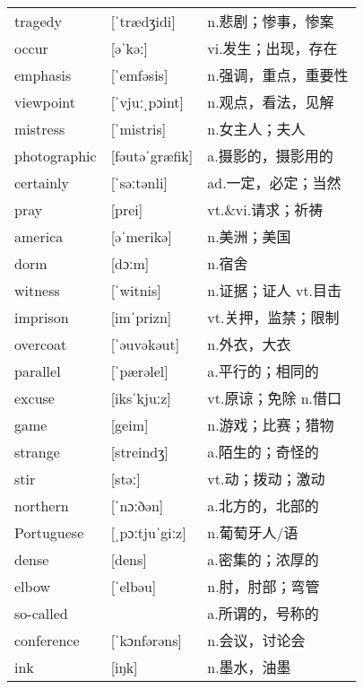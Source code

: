 \documentclass[a4paper]{article}
\begin{document}
\section{}
\begin{tabular}{l l l}

tragedy & [ˈtrædʒidi] & n.悲剧；惨事，惨案 \\
occur & [əˈkəː] & vi.发生；出现，存在 \\
emphasis & [ˈemfəsis] & n.强调，重点，重要性 \\
viewpoint & [ˈvjuːˌpɔint] & n.观点，看法，见解 \\
mistress & [ˈmistris] & n.女主人；夫人 \\
photographic & [fəutəˈgræfik] & a.摄影的，摄影用的 \\
certainly & [ˈsəːtənli] & ad.一定，必定；当然 \\
pray & [prei] & vt.\&vi.请求；祈祷 \\
america & [əˈmerikə] & n.美洲；美国 \\
dorm & [dɔːm] & n.宿舍 \\
witness & [ˈwitnis] & n.证据；证人 vt.目击 \\
imprison & [imˈprizn] & vt.关押，监禁；限制 \\
overcoat & [ˈəuvəkəut] & n.外衣，大衣 \\
parallel & [ˈpærəlel] & a.平行的；相同的 \\
excuse & [iksˈkjuːz] & vt.原谅；免除 n.借口 \\
game & [geim] & n.游戏；比赛；猎物 \\
strange & [streindʒ] & a.陌生的；奇怪的 \\
stir & [stəː] & vt.动；拨动；激动 \\
northern & [ˈnɔːðən] & a.北方的，北部的 \\
Portuguese & [ˌpɔːtjuˈgiːz] & n.葡萄牙人/语 \\
dense & [dens] & a.密集的；浓厚的 \\
elbow & [ˈelbəu] & n.肘，肘部；弯管 \\
so-called &  & a.所谓的，号称的 \\
conference & [ˈkɔnfərəns] & n.会议，讨论会 \\
ink & [iŋk] & n.墨水，油墨 \\

\end{tabular}
\end{document}
